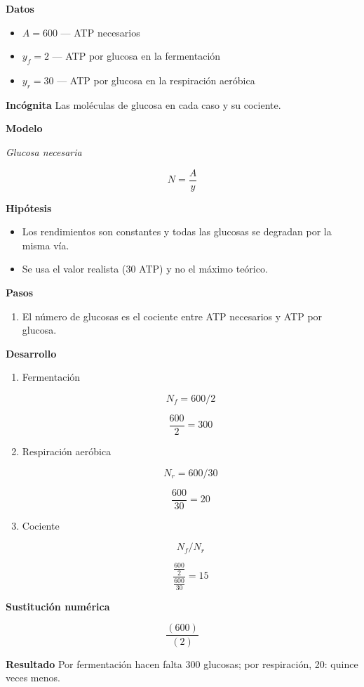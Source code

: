 \documentclass{book}
\begin{document}
\noindent\textbf{Datos}
\begin{itemize}
\item $A = 600$ — ATP necesarios
\item $y_{f} = 2$ — ATP por glucosa en la fermentación
\item $y_{r} = 30$ — ATP por glucosa en la respiración aeróbica
\end{itemize}

\noindent\textbf{Incógnita}
Las moléculas de glucosa en cada caso y su cociente.


\noindent\textbf{Modelo}

\noindent\textit{Glucosa necesaria}

\[
N = \frac{A}{y}
\]

\noindent\textbf{Hipótesis}
\begin{itemize}
\item Los rendimientos son constantes y todas las glucosas se degradan por la misma vía.
\item Se usa el valor realista (30 ATP) y no el máximo teórico.
\end{itemize}

\noindent\textbf{Pasos}
\begin{enumerate}
\item
El número de glucosas es el cociente entre ATP necesarios y ATP por glucosa.

\end{enumerate}

\noindent\textbf{Desarrollo}
\begin{enumerate}
\item
Fermentación


\[
N_f = 600/2
\]

\[
\frac{600}{2} = 300
\]
\item
Respiración aeróbica


\[
N_r = 600/30
\]

\[
\frac{600}{30} = 20
\]
\item
Cociente


\[
N_f/N_r
\]

\[
\frac{\frac{600}{2}}{\frac{600}{30}} = 15
\]
\end{enumerate}

\noindent\textbf{Sustitución numérica}

\[
\frac{\left(600\right)}{\left(2\right)}
\]

\noindent\textbf{Resultado}
Por fermentación hacen falta 300 glucosas; por respiración, 20: quince veces menos.
\end{document}
